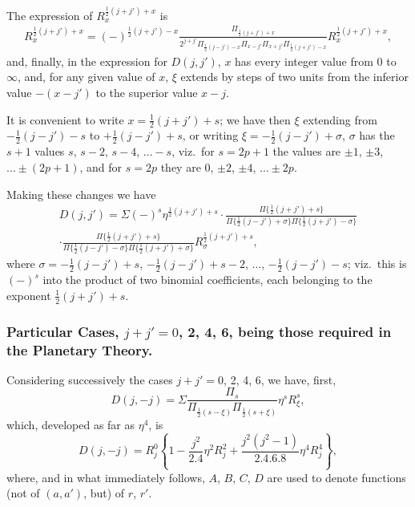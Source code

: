 \documentclass[11pt,a4paper]{article}
\begin{document}
The expression of $R_{x}^{\frac{1}{2}(j+j')+x}$ is
\begin{multline*}
R_{x}^{\frac{1}{2}(j+j')+x} = (-)^{\frac{1}{2}(j+j')-x} \frac{\Pi_{\frac{1}{2}(j+j')+x}}{2^{j+j'} \Pi_{\frac{1}{2}(j-j')-x} \Pi_{x-j'} \Pi_{x+j'} \Pi_{\frac{1}{2}(j+j')-x}} R_{x}^{\frac{1}{2}(j+j')+x},
\end{multline*}
and, finally, in the expression for $D(j, j')$, $x$ has every integer value from 0 to $\infty$, and, for any given value of $x$, $\xi$ extends by steps of two units from the inferior value $-(x-j')$ to the superior value $x-j$.

It is convenient to write $x = \tfrac{1}{2}(j+j') + s$; we have then $\xi$ extending from $-\tfrac{1}{2}(j-j')-s$ to $+\tfrac{1}{2}(j-j')+s$, or writing $\xi = -\tfrac{1}{2}(j-j') + \sigma$, $\sigma$ has the $s+1$ values $s$, $s-2$, $s-4$, $\ldots -s$, viz.\ for $s = 2p+1$ the values are $\pm 1$, $\pm 3$, $\ldots \pm (2p+1)$, and for $s = 2p$ they are $0$, $\pm 2$, $\pm 4$, $\ldots \pm 2p$.

Making these changes we have
\begin{multline*}
D(j, j') = \Sigma (-)^{s} \eta^{\frac{1}{2}(j+j')+s} \cdot \frac{\Pi\{\tfrac{1}{2}(j+j')+s\}}{\Pi\{\tfrac{1}{2}(j-j')+\sigma\} \Pi\{\tfrac{1}{2}(j+j')-\sigma\}} \\
\cdot \frac{\Pi\{\tfrac{1}{2}(j+j')+s\}}{\Pi\{\tfrac{1}{2}(j-j')-\sigma\} \Pi\{\tfrac{1}{2}(j+j')+\sigma\}} R_{\sigma}^{\frac{1}{2}(j+j')+s},
\end{multline*}
where $\sigma = -\tfrac{1}{2}(j-j')+s$, $-\tfrac{1}{2}(j-j')+s-2$, $\ldots$, $-\tfrac{1}{2}(j-j')-s$; viz.\ this is $(-)^{s}$ into the product of two binomial coefficients, each belonging to the exponent $\tfrac{1}{2}(j+j') + s$.

\subsubsection*{Particular Cases, $j + j' = 0$, 2, 4, 6, being those required in the Planetary Theory.}

Considering successively the cases $j + j' = 0$, 2, 4, 6, we have, first,
\[
D(j, -j) = \Sigma \frac{\Pi_{s}}{\Pi_{\frac{1}{2}(s-\xi)} \Pi_{\frac{1}{2}(s+\xi)}} \eta^{s} R_{\xi}^{s},
\]
which, developed as far as $\eta^{4}$, is
\[\tag{*$j+j'=0$}
D(j, -j) = R_{j}^{0} \left\{ 1 - \frac{j^{2}}{2.4} \eta^{2} R_{j}^{2} + \frac{j^{2}(j^{2}-1)}{2.4.6.8} \eta^{4} R_{j}^{4} \right\},
\]
where, and in what immediately follows, $A$, $B$, $C$, $D$ are used to denote functions (not of $(a, a')$, but) of $r$, $r'$.
\end{document}
